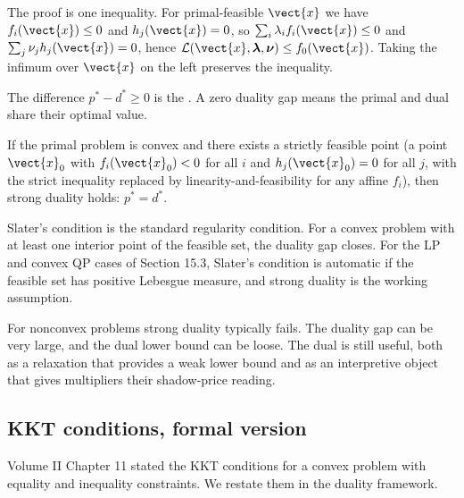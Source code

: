 The proof is one inequality. For primal-feasible $\vect{x}$ we
have $f_{i}(\vect{x}) \leq 0$ and $h_{j}(\vect{x}) = 0$, so
$\sum_{i} \lambda_{i} f_{i}(\vect{x}) \leq 0$ and $\sum_{j} \nu_{j}
h_{j}(\vect{x}) = 0$, hence $\mathcal{L}(\vect{x},
\boldsymbol{\lambda}, \boldsymbol{\nu}) \leq f_{0}(\vect{x})$.
Taking the infimum over $\vect{x}$ on the left preserves the
inequality.

The difference $p^{*} - d^{*} \geq 0$ is the .
A zero duality gap means the primal and dual share their optimal
value.

\begin{theorem}
If the primal problem is convex and there exists a strictly
feasible point (a point $\vect{x}_{0}$ with $f_{i}(\vect{x}_{0}) <
0$ for all $i$ and $h_{j}(\vect{x}_{0}) = 0$ for all $j$, with the
strict inequality replaced by linearity-and-feasibility for any
affine $f_{i}$), then strong duality holds: $p^{*} = d^{*}$.
\end{theorem}

Slater's condition is the standard regularity condition. For a
convex problem with at least one interior point of the feasible
set, the duality gap closes. For the LP and convex QP cases of
Section 15.3, Slater's condition is automatic if the feasible
set has positive Lebesgue measure, and strong duality is the
working assumption.

For nonconvex problems strong duality typically fails. The
duality gap can be very large, and the dual lower bound can be
loose. The dual is still useful, both as a relaxation that
provides a weak lower bound and as an interpretive object that
gives multipliers their shadow-price reading.

\subsection{KKT conditions, formal version}

Volume II Chapter 11 stated the KKT conditions for a convex
problem with equality and inequality constraints. We restate
them in the duality framework.

